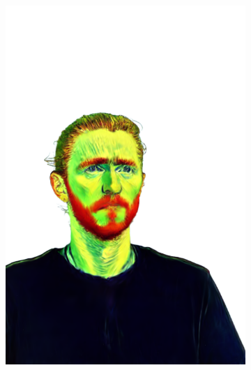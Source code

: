 \begin{figure}[ht]
\begin{subfigure}{0.08\linewidth}
        \includegraphics[width=\textwidth]{Figures/results/high/ephra_vangogh/11_render.png}

\end{subfigure}
\end{figure}
